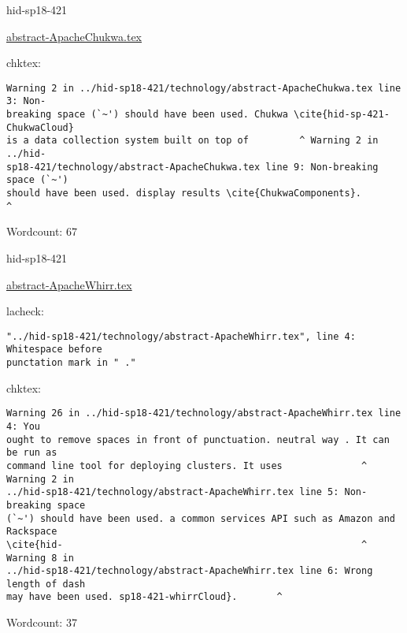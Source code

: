 \begin{IU}

hid-sp18-421

\href{https://github.com/cloudmesh-community/hid-sp18-421/blob/master//technology/abstract-ApacheChukwa.tex}{abstract-ApacheChukwa.tex}

 
chktex:
\begin{tiny}
\begin{verbatim}
Warning 2 in ../hid-sp18-421/technology/abstract-ApacheChukwa.tex line 3: Non-
breaking space (`~') should have been used. Chukwa \cite{hid-sp-421-ChukwaCloud}
is a data collection system built on top of         ^ Warning 2 in ../hid-
sp18-421/technology/abstract-ApacheChukwa.tex line 9: Non-breaking space (`~')
should have been used. display results \cite{ChukwaComponents}.
^
\end{verbatim}
\end{tiny}

Wordcount: 67

\end{IU}



\begin{IU}

hid-sp18-421

\href{https://github.com/cloudmesh-community/hid-sp18-421/blob/master//technology/abstract-ApacheWhirr.tex}{abstract-ApacheWhirr.tex}

 
lacheck:
\begin{tiny}
\begin{verbatim}
"../hid-sp18-421/technology/abstract-ApacheWhirr.tex", line 4: Whitespace before
punctation mark in " ."
\end{verbatim}
\end{tiny}
chktex:
\begin{tiny}
\begin{verbatim}
Warning 26 in ../hid-sp18-421/technology/abstract-ApacheWhirr.tex line 4: You
ought to remove spaces in front of punctuation. neutral way . It can be run as
command line tool for deploying clusters. It uses              ^ Warning 2 in
../hid-sp18-421/technology/abstract-ApacheWhirr.tex line 5: Non-breaking space
(`~') should have been used. a common services API such as Amazon and Rackspace
\cite{hid-                                                     ^ Warning 8 in
../hid-sp18-421/technology/abstract-ApacheWhirr.tex line 6: Wrong length of dash
may have been used. sp18-421-whirrCloud}.       ^
\end{verbatim}
\end{tiny}

Wordcount: 37

\end{IU}


